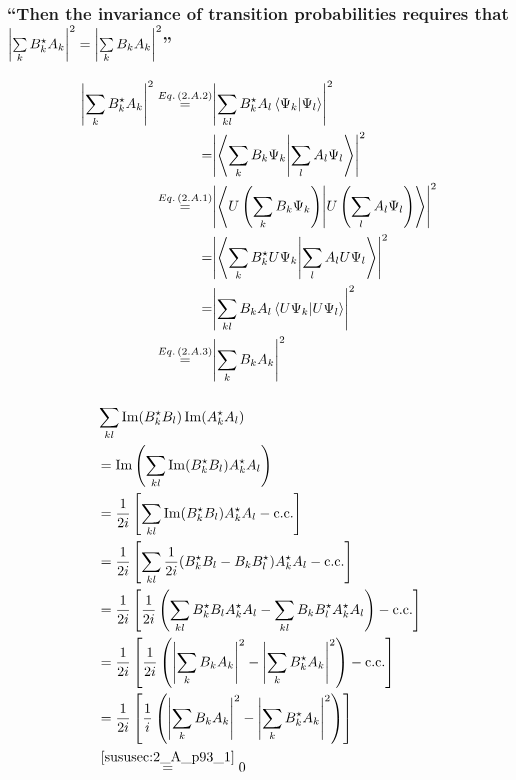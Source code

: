 \subsubsection{\enquote{Then the invariance of transition probabilities requires that $\abs{\sum\limits_{k}B_k^\star A_k}^2=\abs{\sum\limits_{k}B_k A_k}^2$} }\label{sususec:2_A_p93_1}
\begin{align*} 
	\abs{\sum\limits_{k}B_k^\star A_k}^2\overset{\eq{2.A.2}}{=}&\abs{\sum\limits_{k l}B_k^\star A_l \innerproduct{\Psi_k}{\Psi_l}}^2\\
	=&\abs{\innerproduct{\sum\limits_{k}B_k \Psi_k}{\sum\limits_{l}A_l \Psi_l}}^2\\
	\overset{\eq{2.A.1}}{=}&\abs{\innerproduct{U\left(\sum\limits_{k}B_k \Psi_k\right)}{U\left(\sum\limits_{l}A_l \Psi_l\right)}}^2\\
	=&\abs{\innerproduct{\sum\limits_{k}B_k^\star U\Psi_k}{\sum\limits_{l}A_l U\Psi_l}}^2\\
	=&\abs{\sum\limits_{k l}B_k A_l \innerproduct{U\Psi_k}{U\Psi_l}}^2\\
	\overset{\eq{2.A.3}}{=}&\abs{\sum\limits_{k}B_k A_k}^2
\end{align*}

\subsubsection{}
\begin{align*} 
	&\sum\limits_{k l}\Im(B_k^\star B_l) \Im(A_k^\star A_l)\\
	&=\Im\left(\sum\limits_{k l}\Im(B_k^\star B_l) A_k^\star A_l\right)\\
	&=\dfrac{1}{2 i}\left[\sum\limits_{k l}\Im(B_k^\star B_l) A_k^\star A_l- \text{c.c.}\right]\\
	&=\dfrac{1}{2 i}\left[\sum\limits_{k l}\dfrac{1}{2i}(B_k^\star B_l-B_k B_l^\star) A_k^\star A_l- \text{c.c.}\right]\\
	&=\dfrac{1}{2 i}\left[\dfrac{1}{2i}\left(\sum\limits_{k l}B_k^\star B_l A_k^\star A_l- \sum\limits_{k l}B_k B_l^\star A_k^\star A_l\right)- \text{c.c.}\right]\\
	&=\dfrac{1}{2 i}\left[\dfrac{1}{2i}\left(\abs{\sum\limits_{k}B_k A_k}^2-\abs{\sum\limits_{k}B_k^\star A_k}^2\right)- \text{c.c.}\right]\\
	&=\dfrac{1}{2 i}\left[\dfrac{1}{i}\left(\abs{\sum\limits_{k}B_k A_k}^2-\abs{\sum\limits_{k}B_k^\star A_k}^2\right)\right]\\
	&\overset{\ref{sususec:2_A_p93_1}}{=}0
\end{align*}

